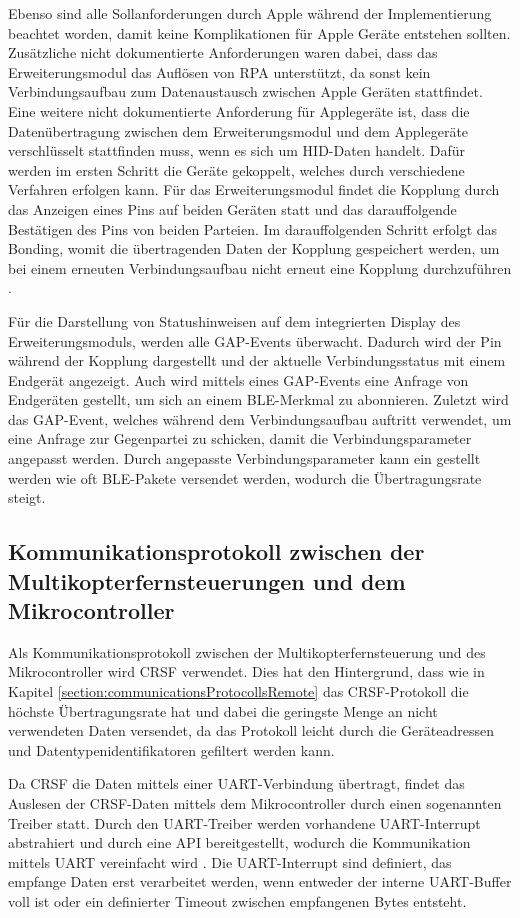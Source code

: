 Ebenso sind alle Sollanforderungen durch Apple während der Implementierung beachtet worden, damit keine Komplikationen für Apple Geräte entstehen sollten. Zusätzliche nicht dokumentierte Anforderungen waren dabei, dass das Erweiterungsmodul das Auflösen von \ac{RPA} unterstützt, da sonst kein Verbindungsaufbau zum Datenaustausch zwischen Apple Geräten stattfindet. Eine weitere nicht dokumentierte Anforderung für Applegeräte ist, dass die Datenübertragung zwischen dem Erweiterungsmodul und dem Applegeräte verschlüsselt stattfinden muss, wenn es sich um \ac{HID}-Daten handelt. Dafür werden im ersten Schritt die Geräte gekoppelt, welches durch verschiedene Verfahren erfolgen kann. Für das Erweiterungsmodul findet die Kopplung durch das Anzeigen eines Pins auf beiden Geräten statt und das darauffolgende Bestätigen des Pins von beiden Parteien. Im darauffolgenden Schritt erfolgt das Bonding, womit die übertragenden Daten der Kopplung gespeichert werden, um bei einem erneuten Verbindungsaufbau nicht erneut eine Kopplung durchzuführen \cite{kyneticsBondingPairng}.

Für die Darstellung von Statushinweisen auf dem integrierten Display des Erweiterungsmoduls, werden alle \ac{GAP}-Events überwacht. Dadurch wird der Pin während der Kopplung dargestellt und der aktuelle Verbindungsstatus mit einem Endgerät angezeigt. Auch wird mittels eines \ac{GAP}-Events eine Anfrage von Endgeräten gestellt, um sich an einem \ac{BLE}-Merkmal zu abonnieren. Zuletzt wird das \ac{GAP}-Event, welches während dem Verbindungsaufbau auftritt verwendet, um eine Anfrage zur Gegenpartei zu schicken, damit die Verbindungsparameter angepasst werden. Durch angepasste Verbindungsparameter kann ein gestellt werden wie oft \ac{BLE}-Pakete versendet werden, wodurch die Übertragungsrate steigt.

\subsection{Kommunikationsprotokoll zwischen der Multikopterfernsteuerungen und dem Mikrocontroller}
Als Kommunikationsprotokoll zwischen der Multikopterfernsteuerung und des Mikrocontroller wird CRSF verwendet. Dies hat den Hintergrund, dass wie in Kapitel \ref{section:communicationsProtocollsRemote} das CRSF-Protokoll die höchste Übertragungsrate hat und dabei die geringste Menge an nicht verwendeten Daten versendet, da das Protokoll leicht durch die Geräteadressen und Datentypenidentifikatoren gefiltert werden kann.

Da CRSF die Daten mittels einer \ac{UART}-Verbindung übertragt, findet das Auslesen der CRSF-Daten mittels dem Mikrocontroller durch einen sogenannten Treiber statt. Durch den \ac{UART}-Treiber werden vorhandene \ac{UART}-Interrupt abstrahiert und durch eine \ac{API} bereitgestellt, wodurch die Kommunikation mittels \ac{UART} vereinfacht wird \cite{espUARTDriver}. Die \ac{UART}-Interrupt sind definiert, das empfange Daten erst verarbeitet werden, wenn entweder der interne \ac{UART}-Buffer voll ist oder ein definierter Timeout zwischen empfangenen Bytes entsteht.

